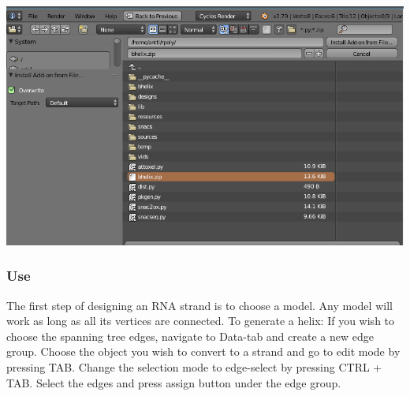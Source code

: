     \includegraphics[width=\textwidth]{images/Sterna_3}
  \subsubsection{Use}
    The first step of designing an RNA strand is to choose a model. Any model will work as long as all its vertices are connected. To generate a helix:
    If you wish to choose the spanning tree edges, navigate to Data-tab and create a new edge group.
    Choose the object you wish to convert to a strand and go to edit mode by pressing TAB.
    Change the selection mode to edge-select by pressing CTRL + TAB.
    Select the edges and press assign button under the edge group.

